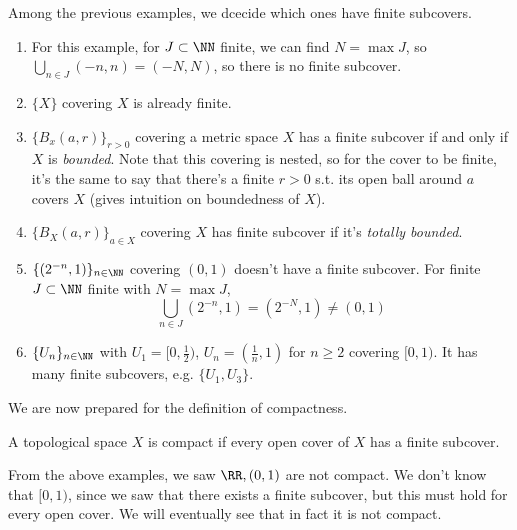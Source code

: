 \begin{example}
  Among the previous examples, we dcecide which ones have finite subcovers. 
  \begin{enumerate}
    \item For this example, for $J\subset \NN$ finite, we can find $N=\max J$,
      so $\bigcup_{n\in J} (-n, n)= (-N,N)$, so there is no finite subcover.
    \item $\{X\}$ covering $X$ is already finite.
    \item $\{B_x(a,r)\}_{r>0}$ covering a metric space $X$ has a finite subcover
      if and only if $X$ is \emph{bounded}. Note that this covering is nested, so for
      the cover to be finite, it's the same to say that there's a finite $r>0$
      s.t. its open ball around $a$ covers $X$ (gives intuition on boundedness
      of $X$).
    \item $\{B_X(a,r)\}_{a\in X}$ covering $X$ has finite subcover if it's
      \emph{totally bounded}. 
    \item $\{(2^{-n},1)\}_{n\in\NN}$ covering $(0,1)$ doesn't have a finite
      subcover. For finite $J\subset\NN$ finite with $N=\max J$, 
      \[\bigcup_{n\in J} (2^{-n},1) = (2^{-N}, 1) \neq (0,1)\]
    \item $\{U_n\}_{n\in\NN}$ with $U_1=[0,\frac{1}{2})$,
      $U_n=(\frac{1}{n},1)$ for $n\geq 2$ covering $[0,1)$. It has many finite
      subcovers, e.g. $\{U_1,U_3\}$.
  \end{enumerate}
\end{example}
We are now prepared for the definition of compactness.
\begin{definition}
  A topological space $X$ is compact if every open cover of $X$ has a finite
  subcover.
  \label{def:compactness}
\end{definition}
From the above examples, we saw $\RR, (0,1)$ are not compact. We don't know that
$[0,1)$, since we saw that there exists a finite subcover, but this must hold
for every open cover. We will eventually see that in fact it is not compact.


